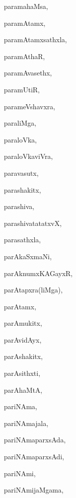 \begin{multicols}{3}
{\noindent
{paramahaMsa}, \pageref{paramahaMsa}

\noindent
{paramAtamx}, \pageref{paramAtamx}

\noindent
{paramAtamxsathxla}, \pageref{paramAtamxsathxla}

\noindent
{paramAthaR}, \pageref{paramAthaR}

\noindent
{paramAvasethx}, \pageref{paramAvasethx}

\noindent
{paramUtiR}, \pageref{paramUtiR}

\noindent
{parameVshavxra}, \pageref{parameVshavxra}

\noindent
{paraliMga}, \pageref{paraliMga}

\noindent
{paraloVka}, \pageref{paraloVka}

\noindent
{paraloVkaviVra}, \pageref{paraloVkaviVra}

\noindent
{paravasutx}, \pageref{paravasutx}

\noindent
{parashakitx}, \pageref{parashakitx}

\noindent
{parashiva}, \pageref{parashiva}

\noindent
{parashivatatatxvX}, \pageref{parashivatatatxvX}

\noindent
{parasathxla}, \pageref{parasathxla}

\noindent
{parAkaSxmaNi}, \pageref{parAkaSxmaNi}

\noindent
{parAknumxKAGayxR}, \pageref{parAknumxKAGayxR}

\noindent
{parAtapxra(liMga)}, \pageref{parAtapxraliMga}

\noindent
{parAtamx}, \pageref{parAtamx}

\noindent
{parAmukitx}, \pageref{parAmukitx}

\noindent
{parAvidAyx}, \pageref{parAvidAyx}

\noindent
{parAshakitx}, \pageref{parAshakitx}

\noindent
{parAsithxti}, \pageref{parAsithxti}

\noindent
{parAhaMtA}, \pageref{parAhaMtA}

\noindent
{pariNAma}, \pageref{pariNAma}

\noindent
{pariNAmajala}, \pageref{pariNAmajala}

\noindent
{pariNAmaparxsAda}, \pageref{pariNAmaparxsAda}

\noindent
{pariNAmaparxsAdi}, \pageref{pariNAmaparxsAdi}

\noindent
{pariNAmi}, \pageref{pariNAmi}

\noindent
{pariNAmijaMgama}, \pageref{pariNAmijaMgama}

}
\end{multicols}
